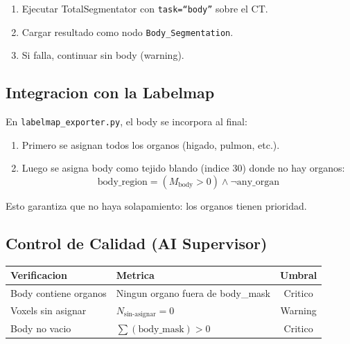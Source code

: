\documentclass[12pt,a4paper]{article}
\begin{document}
\begin{enumerate}
    \item Ejecutar TotalSegmentator con \texttt{task=``body''} sobre el CT.
    \item Cargar resultado como nodo \texttt{Body\_Segmentation}.
    \item Si falla, continuar sin body (warning).
\end{enumerate}

\subsection{Integracion con la Labelmap}

En \texttt{labelmap\_exporter.py}, el body se incorpora al final:

\begin{enumerate}
    \item Primero se asignan todos los organos (higado, pulmon, etc.).
    \item Luego se asigna body como tejido blando (indice 30) donde no hay organos:
          \begin{equation}\label{eq:body_labelmap}
              \text{body\_region} = (M_{\text{body}} > 0) \land
              \lnot \text{any\_organ}
          \end{equation}
\end{enumerate}

Esto garantiza que no haya solapamiento: los organos tienen prioridad.

\subsection{Control de Calidad (AI Supervisor)}

\begin{table}[H]
\centering
\begin{tabular}{llc}
\toprule
\textbf{Verificacion} & \textbf{Metrica} & \textbf{Umbral} \\
\midrule
Body contiene organos & Ningun organo fuera de body\_mask & Critico \\
Voxels sin asignar & $N_{\text{sin-asignar}} = 0$ & Warning \\
Body no vacio & $\sum(\text{body\_mask}) > 0$ & Critico \\
\bottomrule
\end{tabular}
\end{table}

\newpage

\end{document}

